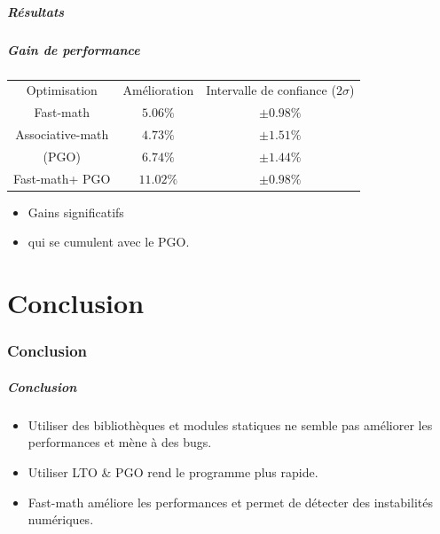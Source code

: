 \documentclass{beamer}
\begin{document}
\subsubsection{Résultats}

\begin{frame}[fragile]
    \frametitle{Gain de performance}

    \begin{center}
        \begin{tabular}{ c c c }
            Optimisation                    & Amélioration & Intervalle de confiance ($2\sigma$) \\
            Fast-math\footnotemark[1]       & $5.06\%$     & $\pm 0.98\%$                        \\
            Associative-math                & $4.73\%$     & $\pm 1.51\%$                        \\
            (PGO)                           & $6.74\%$     & $\pm 1.44\%$                        \\
            Fast-math\footnotemark[1] + PGO & $11.02\%$    & $\pm 0.98\%$
        \end{tabular}
    \end{center}

    \begin{itemize}
        \item Gains significatifs
        \item qui se cumulent avec le PGO.
    \end{itemize}

\end{frame}

\part{Conclusion}
\section*{Conclusion}

\begin{frame}[fragile]
    \frametitle{Conclusion}

    \begin{itemize}
        \item Utiliser des bibliothèques et modules statiques ne semble pas améliorer les performances et mène à des bugs.
        \item Utiliser LTO \& PGO rend le programme plus rapide.
        \item Fast-math améliore les performances et permet de détecter des instabilités numériques.
    \end{itemize}
\end{frame}
\end{document}
